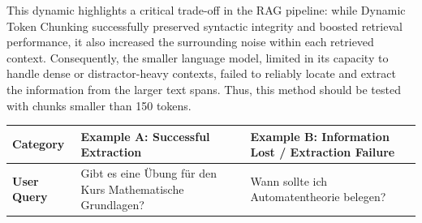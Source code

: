 \documentclass[12pt]{article} %
\begin{document}
This dynamic highlights a critical trade-off in the RAG pipeline: while Dynamic Token Chunking successfully preserved syntactic integrity and boosted retrieval performance, it also increased the surrounding noise within each retrieved context. Consequently, the smaller language model, limited in its capacity to handle dense or distractor-heavy contexts, failed to reliably locate and extract the information from the larger text spans. Thus, this method should be tested with chunks smaller than 150 tokens.
\begin{table}[htbp]
    \centering
    \small
    \renewcommand{\arraystretch}{1.3}
    \begin{tabularx}{\textwidth}{l X X}
        \toprule
        \textbf{Category}                                                                                                                                                                                                                                                                                                                       & \textbf{Example A: Successful Extraction} & \textbf{Example B: Information Lost / Extraction Failure}                                                                                                                                                                                                                        \\
        \midrule
        \textbf{User Query}                                                                                                                                                                                                                                                                                                                     &
        Gibt es eine \"Ubung f\"ur den Kurs Mathematische Grundlagen?                                                                                                                                                                                                                                                                           &
        Wann sollte ich Automatentheorie belegen?                                                                                                                                                                                                                                                                                                                                                                                                                                                                                                                                                                                                                              \\

\end{tabularx}
\end{table}
\end{document}
